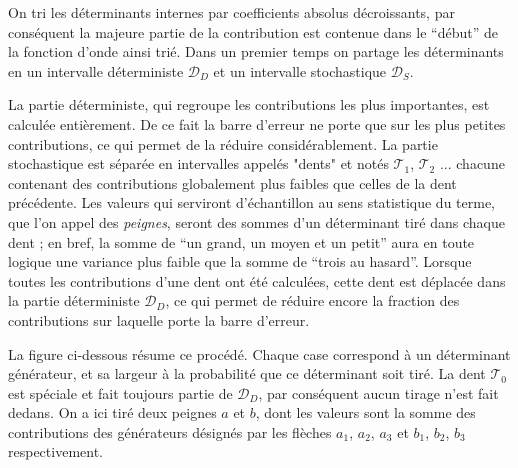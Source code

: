\documentclass[./thesis.tex]{subfiles}
\begin{document}
On tri les déterminants internes par coefficients absolus décroissants, par conséquent la majeure partie de la contribution est contenue dans le ``début'' de la fonction d'onde ainsi trié. Dans un premier temps on partage les déterminants en un intervalle déterministe $\mathcal{D}_D$ et un intervalle stochastique $\mathcal{D}_S$.

La partie déterministe, qui regroupe les contributions les plus importantes, est calculée entièrement. De ce fait la barre d'erreur ne porte que sur les plus petites contributions, ce qui permet de la réduire considérablement. La partie stochastique est séparée en intervalles appelés "dents" et notés $\mathcal{T}_1$, $\mathcal{T}_2$ ...   chacune contenant des contributions globalement plus faibles que celles de la dent précédente. Les valeurs qui serviront d'échantillon au sens statistique du terme, que l'on appel des \emph{peignes}, seront des sommes d'un déterminant tiré dans chaque dent ; en bref, la somme de ``un grand, un moyen et un petit'' aura en toute logique une variance plus faible que la somme de ``trois au hasard''. Lorsque toutes les contributions d'une dent ont été calculées, cette dent est déplacée dans la partie déterministe $\mathcal{D}_D$, ce qui permet de réduire encore la fraction des contributions sur laquelle porte la barre d'erreur. 

La figure ci-dessous résume ce procédé.
Chaque case correspond à un déterminant générateur, et sa largeur à la probabilité que ce déterminant soit tiré. La dent $\mathcal{T}_0$ est spéciale et fait toujours partie de $\mathcal{D}_D$, par conséquent aucun tirage n'est fait dedans. On a ici tiré deux peignes $a$ et $b$, dont les valeurs sont la somme des contributions des générateurs désignés par les flèches $a_1$, $a_2$, $a_3$ et $b_1$, $b_2$, $b_3$ respectivement.
\end{document}
